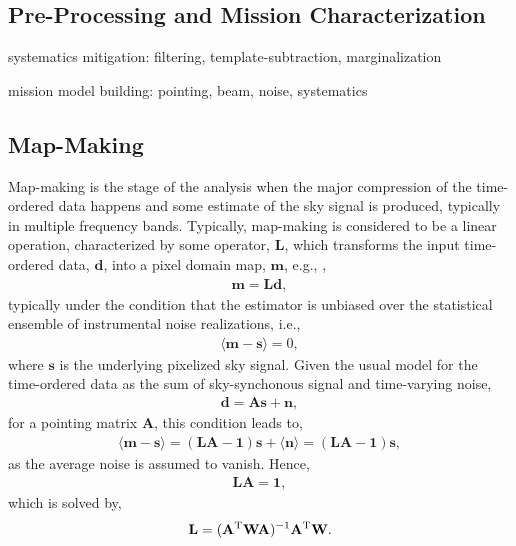 \subsection{Pre-Processing and Mission Characterization}

systematics mitigation: filtering, template-subtraction, marginalization

mission model building: pointing, beam, noise, systematics

\subsection{Map-Making}

Map-making is the stage of the analysis when the major compression of the time-ordered data happens and some estimate of the sky signal is produced, typically in multiple frequency bands. Typically, map-making is considered to be a linear operation, characterized by some operator, $\mathbf{L}$, which transforms the input time-ordered data, $\mathbf{d}$, into a pixel domain map, $\mathbf{m}$, 
e.g., \cite{Tegmark1997},
\begin{eqnarray}
\mathbf{m} = \mathbf{L}\mathbf{d},
\end{eqnarray}
typically under the condition that the estimator is unbiased over the statistical ensemble of instrumental noise realizations, i.e.,
\begin{eqnarray}
\langle \mathbf{m} - \mathbf{s}\rangle = 0,
\label{eq:condMaps}
\end{eqnarray}
where $\mathbf{s}$ is the underlying pixelized sky signal. Given the usual model for the time-ordered data as the sum of sky-synchonous signal and time-varying noise, 
\begin{eqnarray}
\mathbf{d} = \mathbf{A}\mathbf{s} + \mathbf{n},
\end{eqnarray}
for a pointing matrix $\mathbf{A}$, this condition leads to,
\begin{eqnarray}
\langle \mathbf{m} - \mathbf{s}\rangle =  (\mathbf{L}\mathbf{A}-\mathbf{1})\mathbf{s} 
+ \langle \mathbf{n} \rangle = (\mathbf{L}\mathbf{A}-\mathbf{1})\mathbf{s},
\end{eqnarray}
as the average noise is assumed to vanish. Hence,
\begin{eqnarray}
\mathbf{L}\mathbf{A} = \mathbf{1},
\end{eqnarray}
which is solved by,
\begin{eqnarray}
\mathbf{L} = (\mathbf{A}^{\rm T} \mathbf{W} \mathbf{A})^{-1} \mathbf{A}^{\rm T} \mathbf{W}.
\end{eqnarray}
